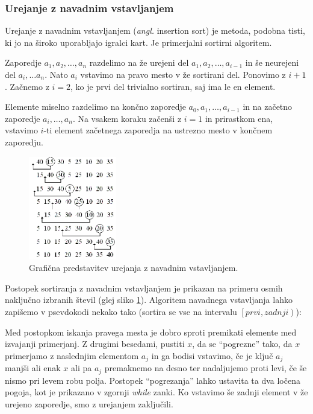 \documentclass[a4paper,oneside]{article}
\begin{document}
\subsubsection{Urejanje z navadnim vstavljanjem}
\label{chapter:insertionsort}
Urejanje z navadnim vstavljanjem (\emph{angl.} insertion sort) je metoda,
podobna tisti, ki jo na široko uporabljajo igralci kart. Je primerjalni sortirni algoritem.

Zaporedje $a_1, a_2, \ldots, a_n$ razdelimo na že urejeni del $a_1, a_2, \ldots, a_{i-1}$
in še neurejeni del $a_i, \ldots a_n$. Nato $a_i$ vstavimo na pravo mesto v že sortirani
del. Ponovimo z $i + 1$. Začnemo z $i = 2$, ko je prvi del trivialno sortiran, saj ima le
en element.

Elemente miselno razdelimo na končno zaporedje $a_0, a_1, \ldots,
a_{i-1}$ in na začetno zaporedje $a_i,\ldots, a_n$. Na vsakem koraku začenši z $i = 1$ in
prirastkom ena, vstavimo $i$-ti element začetnega zaporedja na ustrezno mesto v končnem
zaporedju.

\begin{figure}[h]
    \begin{center}
        \includegraphics[height=45mm]{slike/insertionsort.png}
    \end{center}
    \vspace{-0.7cm}
    \caption{Grafična predstavitev urejanja z navadnim vstavljanjem.}
    \label{fig:insertionsortimage}
\end{figure}

Postopek sortiranja z navadnim vstavljanjem je prikazan na primeru osmih naključno
izbranih števil (glej sliko \ref{fig:insertionsortimage}). Algoritem navadnega
vstavljanja lahko zapišemo v psevdokodi nekako tako (sortira se vse na intervalu
$\left[prvi, zadnji\right)$):



Med postopkom iskanja pravega mesta je dobro sproti premikati elemente med izvajanji
primerjanj. Z drugimi besedami, pustiti $x$, da se ``pogrezne'' tako, da $x$
primerjamo z naslednjim elementom $a_j$ in ga bodisi vstavimo, če je ključ $a_j$ manjši
ali enak $x$ ali pa $a_j$ premaknemo na desno ter nadaljujemo proti levi, če še nismo pri
levem robu polja. Postopek ``pogrezanja'' lahko ustavita ta dva ločena
pogoja, kot je prikazano v zgornji \emph{while} zanki.  Ko vstavimo še zadnji element v že 
urejeno zaporedje, smo z urejanjem zaključili.\\
\end{document}
